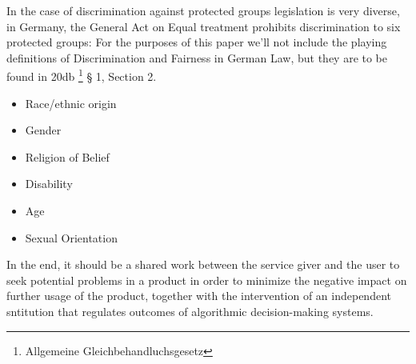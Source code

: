 In the case of discrimination against protected groups legislation is very diverse, in Germany, the General Act on Equal treatment prohibits discrimination to six protected groups: \cite{20db} For the purposes of this paper we'll not include the playing definitions of Discrimination and Fairness in German Law, but they are to be found in 20db \footnote{Allgemeine Gleichbehandluchsgesetz} § 1, Section 2.
\begin{itemize}
  \item Race/ethnic origin
  \item Gender
  \item Religion of Belief
  \item Disability
  \item Age
  \item Sexual Orientation
\end{itemize}

In the end, it should be a shared work between the service giver and the user to seek potential problems in a product in order to minimize the negative impact on further usage of the product, together with the intervention of an independent sntitution that regulates outcomes of algorithmic decision-making systems.

